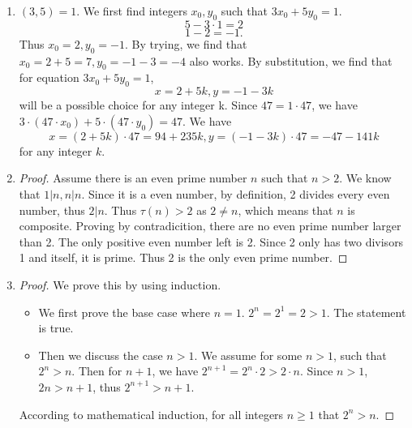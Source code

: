 \documentclass[11pt,a4paper]{article}
\begin{document}
\begin{enumerate}
	\item $(3,5)=1$. We first find integers $x_0, y_0$ such that $3x_0+5y_0=1.$ \[5-3\cdot 1 = 2\] \[1-2=-1.\] Thus $x_0=2, y_0=-1.$ By trying, we find that $x_0=2+5=7, y_0=-1-3=-4$ also works. By substitution, we find that for equation $3x_0+5y_0=1$, \[x=2+5k, y=-1-3k\] will be a possible choice for any integer k. Since $47=1\cdot 47$, we have $3\cdot (47\cdot x_0) + 5\cdot (47\cdot y_0) = 47.$ We have \[x=(2+5k)\cdot 47 = 94+235k, y=(-1-3k)\cdot 47 = -47-141k\] for any integer $k$.

	\item \begin{proof} Assume there is an even prime number $n$ such that $n>2$. We know that $1|n, n|n$. Since it is a even number, by definition, 2 divides every even number, thus $2|n$. Thus $\tau (n)>2$ as $2\neq n$, which means that $n$ is composite. Proving by contradicition, there are no even prime number larger than 2. The only positive even number left is 2. Since 2 only has two divisors 1 and itself, it is prime. Thus 2 is the only even prime number. \end{proof}

	\item \begin{proof} We prove this by using induction.
		\begin{itemize}
		\item We first prove the base case where $n=1$. $2^n = 2^1 = 2 > 1$. The statement is true.
		\item Then we discuss the case $n>1$. We assume for some $n>1$, such that \(2^{n} > n\). Then for $n+1$, we have $2^{n+1} = 2^n\cdot 2 > 2\cdot n.$ Since $n>1$, $2n>n+1$, thus $2^{n+1}>n+1.$
		\end{itemize} According to mathematical induction, for all integers \(n \ge 1\) that \(2^{n} > n\).\end{proof}
\end{enumerate}
\end{document}
